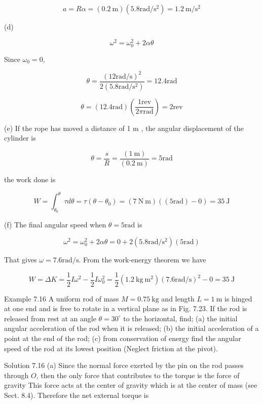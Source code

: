 \documentclass[10pt]{article}
\begin{document}
$$
a=R \alpha=(0.2 \mathrm{~m})\left(5.8 \mathrm{rad} / \mathrm{s}^{2}\right)=1.2 \mathrm{~m} / \mathrm{s}^{2}
$$

(d)

$$
\omega^{2}=\omega_{0}^{2}+2 \alpha \theta
$$

Since $\omega_{0}=0$,

$$
\theta=\frac{(12 \mathrm{rad} / \mathrm{s})^{2}}{2\left(5.8 \mathrm{rad} / \mathrm{s}^{2}\right)}=12.4 \mathrm{rad}
$$

$$
\theta=(12.4 \mathrm{rad})\left(\frac{1 \mathrm{rev}}{2 \pi \mathrm{rad}}\right)=2 \mathrm{rev}
$$

(e) If the rope has moved a distance of 1 m , the angular displacement of the cylinder is

$$
\theta=\frac{s}{R}=\frac{(1 \mathrm{~m})}{(0.2 \mathrm{~m})}=5 \mathrm{rad}
$$

the work done is

$$
W=\int_{\theta_{0}}^{\theta} \tau d \theta=\tau\left(\theta-\theta_{0}\right)=(7 \mathrm{~N} \mathrm{~m})((5 \mathrm{rad})-0)=35 \mathrm{~J}
$$

(f) The final angular speed when $\theta=5 \mathrm{rad}$ is

$$
\omega^{2}=\omega_{0}^{2}+2 \alpha \theta=0+2\left(5.8 \mathrm{rad} / \mathrm{s}^{2}\right)(5 \mathrm{rad})
$$

That gives $\omega=7.6 \mathrm{rad} / \mathrm{s}$. From the work-energy theorem we have

$$
W=\Delta K=\frac{1}{2} I \omega^{2}-\frac{1}{2} I \omega_{0}^{2}=\frac{1}{2}\left(1.2 \mathrm{~kg} \mathrm{~m}^{2}\right)(7.6 \mathrm{rad} / \mathrm{s})^{2}-0=35 \mathrm{~J}
$$

Example 7.16 A uniform rod of mass $M=0.75 \mathrm{~kg}$ and length $L=1 \mathrm{~m}$ is hinged at one end and is free to rotate in a vertical plane as in Fig. 7.23. If the rod is released from rest at an angle $\theta=30^{\circ}$ to the horizontal, find; (a) the initial angular acceleration of the rod when it is released; (b) the initial acceleration of a point at the end of the rod; (c) from conservation of energy find the angular speed of the rod at its lowest position (Neglect friction at the pivot).

Solution 7.16 (a) Since the normal force exerted by the pin on the rod passes through $O$, then the only force that contributes to the torque is the force of gravity This force acts at the center of gravity which is at the center of mass (see Sect. 8.4). Therefore the net external torque is
\end{document}
